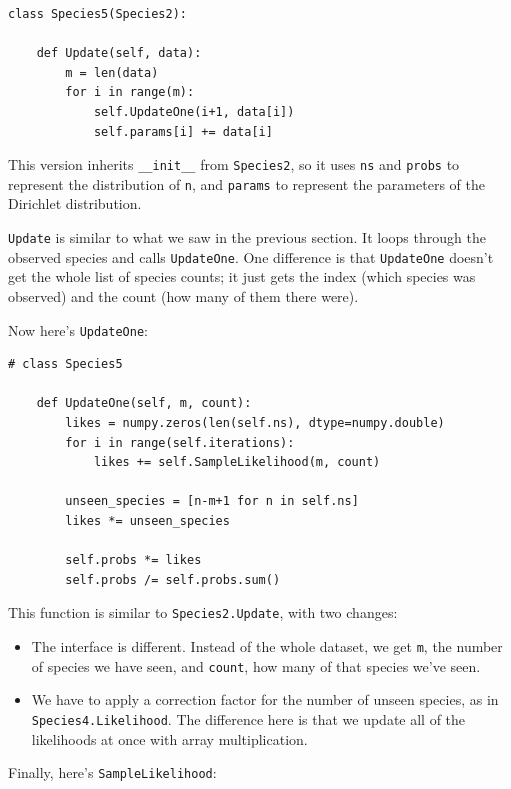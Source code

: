 \documentclass[12pt]{book}
\begin{document}
\begin{verbatim}
class Species5(Species2):
    
    def Update(self, data):
        m = len(data)
        for i in range(m):
            self.UpdateOne(i+1, data[i])
            self.params[i] += data[i]
\end{verbatim}

This version inherits \verb"__init__" from {\tt Species2}, so
it uses {\tt ns} and {\tt probs} to represent the distribution
of {\tt n}, and {\tt params} to represent the parameters of
the Dirichlet distribution.

{\tt Update} is similar to what we saw in the previous section.
It loops through the observed species and calls {\tt UpdateOne}.
One difference is that {\tt UpdateOne} doesn't get the whole list
of species counts; it just gets the index (which species was
observed) and the count (how many of them there were).

Now here's {\tt UpdateOne}:

\begin{verbatim}
# class Species5

    def UpdateOne(self, m, count):
        likes = numpy.zeros(len(self.ns), dtype=numpy.double)
        for i in range(self.iterations):
            likes += self.SampleLikelihood(m, count)

        unseen_species = [n-m+1 for n in self.ns]
        likes *= unseen_species

        self.probs *= likes
        self.probs /= self.probs.sum()
\end{verbatim}

This function is similar to {\tt Species2.Update}, with two changes:

\begin{itemize}

\item The interface is different.  Instead of the whole dataset,
we get {\tt m}, the number
of species we have seen, and {\tt count}, how many of that
species we've seen.

\item We have to apply a correction factor for the number
of unseen species, as in {\tt Species4.Likelihood}.  The difference
here is that we update all of the likelihoods at once with
array multiplication.

\end{itemize}

Finally, here's {\tt SampleLikelihood}:
\end{document}
